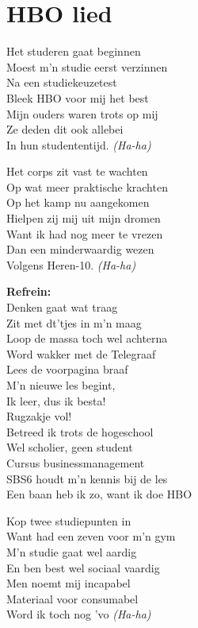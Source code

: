 \section{HBO lied}
Het studeren gaat beginnen\\
Moest m'n studie eerst verzinnen\\
Na een studiekeuzetest\\
Bleek HBO voor mij het best\\
Mijn ouders waren trots op mij\\
Ze deden dit ook allebei\\
In hun studententijd. \textit{(Ha-ha)}

Het corps zit vast te wachten\\
Op wat meer praktische krachten\\
Op het kamp nu aangekomen\\
Hielpen zij mij uit mijn dromen\\
Want ik had nog meer te vrezen\\
Dan een minderwaardig wezen\\
Volgens Heren-10. \textit{(Ha-ha)}

\textbf{Refrein:}\\
Denken gaat wat traag\\
Zit met dt'tjes in m'n maag\\
Loop de massa toch wel achterna\\
Word wakker met de Telegraaf\\
Lees de voorpagina braaf\\
M'n nieuwe les begint,\\
Ik leer, dus ik besta!\\
Rugzakje vol!\\
Betreed ik trots de hogeschool\\
Wel scholier, geen student\\
Cursus businessmanagement\\
SBS6 houdt m'n kennis bij de les\\
Een baan heb ik zo, want ik doe HBO

Kop twee studiepunten in\\
Want had een zeven voor m'n gym\\
M'n studie gaat wel aardig\\
En ben best wel sociaal vaardig\\
Men noemt mij incapabel\\
Materiaal voor consumabel\\
Word ik toch nog 'vo \textit{(Ha-ha)}

